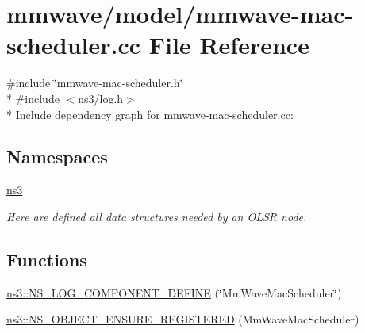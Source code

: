 \hypertarget{mmwave-mac-scheduler_8cc}{}\section{mmwave/model/mmwave-\/mac-\/scheduler.cc File Reference}
\label{mmwave-mac-scheduler_8cc}
{\ttfamily \#include \char`\"{}mmwave-\/mac-\/scheduler.\+h\char`\"{}}\\*
{\ttfamily \#include $<$ns3/log.\+h$>$}\\*
Include dependency graph for mmwave-\/mac-\/scheduler.cc\+:
\subsection*{Namespaces}
\begin{DoxyCompactItemize}
\item 
 \hyperlink{namespacens3}{ns3}
\begin{DoxyCompactList}\small\item\em Here are defined all data structures needed by an O\+L\+SR node. \end{DoxyCompactList}\end{DoxyCompactItemize}
\subsection*{Functions}
\begin{DoxyCompactItemize}
\item 
\hyperlink{namespacens3_a8dff8aa2cbb56a934e95aca6f0641ab8}{ns3\+::\+N\+S\+\_\+\+L\+O\+G\+\_\+\+C\+O\+M\+P\+O\+N\+E\+N\+T\+\_\+\+D\+E\+F\+I\+NE} (\char`\"{}Mm\+Wave\+Mac\+Scheduler\char`\"{})
\item 
\hyperlink{namespacens3_a34fae57828f385cf0b673306394d455c}{ns3\+::\+N\+S\+\_\+\+O\+B\+J\+E\+C\+T\+\_\+\+E\+N\+S\+U\+R\+E\+\_\+\+R\+E\+G\+I\+S\+T\+E\+R\+ED} (Mm\+Wave\+Mac\+Scheduler)
\end{DoxyCompactItemize}
